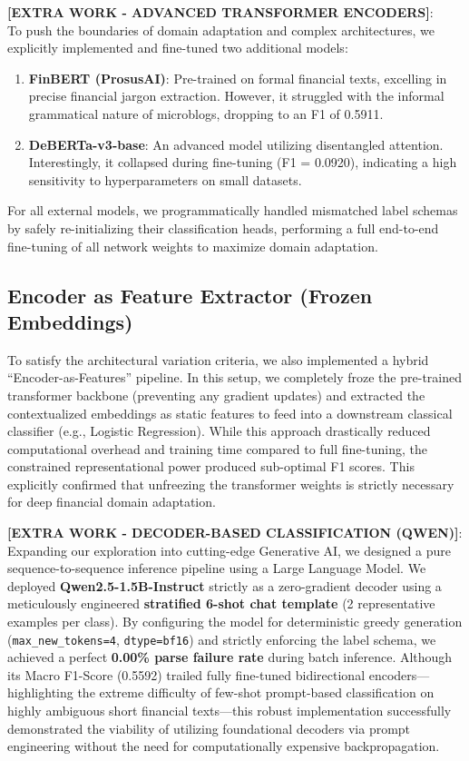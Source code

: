 \documentclass[11pt,a4paper]{article}
\begin{document}
\vspace{0.8em}
\noindent \textbf{[EXTRA WORK - ADVANCED TRANSFORMER ENCODERS]}:\\
To push the boundaries of domain adaptation and complex architectures, we explicitly implemented and fine-tuned two additional models:
\begin{enumerate}[noitemsep]
    \item \textbf{FinBERT (ProsusAI)}: Pre-trained on formal financial texts, excelling in precise financial jargon extraction. However, it struggled with the informal grammatical nature of microblogs, dropping to an F1 of 0.5911.
    \item \textbf{DeBERTa-v3-base}: An advanced model utilizing disentangled attention. Interestingly, it collapsed during fine-tuning (F1 = 0.0920), indicating a high sensitivity to hyperparameters on small datasets.
\end{enumerate}
For all external models, we programmatically handled mismatched label schemas by safely re-initializing their classification heads, performing a full end-to-end fine-tuning of all network weights to maximize domain adaptation.

\subsection{Encoder as Feature Extractor (Frozen Embeddings)}
To satisfy the architectural variation criteria, we also implemented a hybrid ``Encoder-as-Features'' pipeline. In this setup, we completely froze the pre-trained transformer backbone (preventing any gradient updates) and extracted the contextualized embeddings as static features to feed into a downstream classical classifier (e.g., Logistic Regression). While this approach drastically reduced computational overhead and training time compared to full fine-tuning, the constrained representational power produced sub-optimal F1 scores. This explicitly confirmed that unfreezing the transformer weights is strictly necessary for deep financial domain adaptation.

\vspace{0.8em}
\noindent \textbf{[EXTRA WORK - DECODER-BASED CLASSIFICATION (QWEN)]}:\\
Expanding our exploration into cutting-edge Generative AI, we designed a pure sequence-to-sequence inference pipeline using a Large Language Model. We deployed \textbf{Qwen2.5-1.5B-Instruct} strictly as a zero-gradient decoder using a meticulously engineered \textbf{stratified 6-shot chat template} (2 representative examples per class). 
By configuring the model for deterministic greedy generation (\texttt{max\_new\_tokens=4}, \texttt{dtype=bf16}) and strictly enforcing the label schema, we achieved a perfect \textbf{0.00\% parse failure rate} during batch inference. 
Although its Macro F1-Score (0.5592) trailed fully fine-tuned bidirectional encoders---highlighting the extreme difficulty of few-shot prompt-based classification on highly ambiguous short financial texts---this robust implementation successfully demonstrated the viability of utilizing foundational decoders via prompt engineering without the need for computationally expensive backpropagation.
\end{document}
